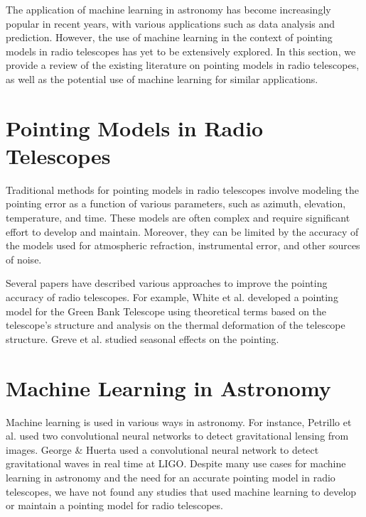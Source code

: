 The application of machine learning in astronomy has become increasingly popular in recent years, with various applications such as data analysis and prediction.
However, the use of machine learning in the context of pointing models in radio telescopes has yet to be extensively explored.
In this section, we provide a review of the existing literature on pointing models in radio telescopes, as well as the potential use of machine learning for similar applications.

\section{Pointing Models in Radio Telescopes}
Traditional methods for pointing models in radio telescopes involve modeling the pointing error as a function of various parameters, such as azimuth, elevation, temperature, and time.
These models are often complex and require significant effort to develop and maintain.
Moreover, they can be limited by the accuracy of the models used for atmospheric refraction, instrumental error, and other sources of noise.

Several papers have described various approaches to improve the pointing accuracy of radio telescopes.
For example, White et al. \cite{whitegreen2022} developed a pointing model for the Green Bank Telescope using theoretical terms based on the telescope's structure and analysis on the thermal deformation of the telescope structure.
Greve et al. \cite{greve1996pointing} studied seasonal effects on the pointing.

\section{Machine Learning in Astronomy}
Machine learning is used in various ways in astronomy.
For instance, Petrillo et al. \cite{mlastgravlens} used two convolutional neural networks to detect gravitational lensing from images.
George \& Huerta \cite{mlastgravitationalwaves} used a convolutional neural network to detect gravitational waves in real time at LIGO.
Despite many use cases for machine learning in astronomy and the need for an accurate pointing model in radio telescopes,
we have not found any studies that used machine learning to develop or maintain a pointing model for radio telescopes.



